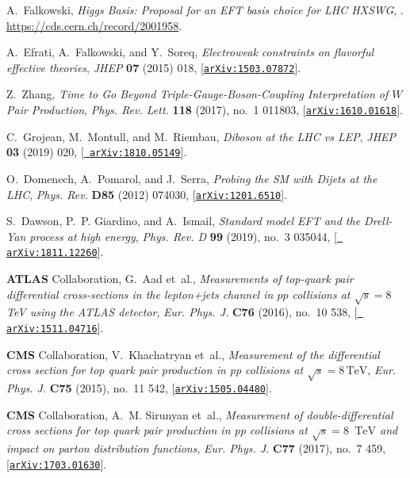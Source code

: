 \documentclass[11pt,a4paper]{article}
\numberwithin{equation}{section}
\numberwithin{figure}{section}
\numberwithin{table}{section}
\begin{document}
\begin{thebibliography}{100}
A.~Falkowski, {\it {Higgs Basis: Proposal for an EFT basis choice for LHC
  HXSWG}}, . \url{https://cds.cern.ch/record/2001958}.

A.~Efrati, A.~Falkowski, and Y.~Soreq, {\it {Electroweak constraints on
  flavorful effective theories}},  {\em JHEP} {\bf 07} (2015) 018,
  [\href{http://arxiv.org/abs/1503.07872}{{\tt arXiv:1503.07872}}].

Z.~Zhang, {\it {Time to Go Beyond Triple-Gauge-Boson-Coupling Interpretation of
  $W$ Pair Production}},  {\em Phys. Rev. Lett.} {\bf 118} (2017), no.~1
  011803, [\href{http://arxiv.org/abs/1610.01618}{{\tt arXiv:1610.01618}}].

C.~Grojean, M.~Montull, and M.~Riembau, {\it {Diboson at the LHC vs LEP}},
  {\em JHEP} {\bf 03} (2019) 020, [\href{http://arxiv.org/abs/1810.05149}{{\tt
  arXiv:1810.05149}}].

O.~Domenech, A.~Pomarol, and J.~Serra, {\it {Probing the SM with Dijets at the
  LHC}},  {\em Phys. Rev.} {\bf D85} (2012) 074030,
  [\href{http://arxiv.org/abs/1201.6510}{{\tt arXiv:1201.6510}}].

S.~Dawson, P.~P. Giardino, and A.~Ismail, {\it {Standard model EFT and the
  Drell-Yan process at high energy}},  {\em Phys. Rev. D} {\bf 99} (2019),
  no.~3 035044, [\href{http://arxiv.org/abs/1811.12260}{{\tt
  arXiv:1811.12260}}].

{\bf ATLAS} Collaboration, G.~Aad et~al., {\it {Measurements of top-quark pair
  differential cross-sections in the lepton+jets channel in $pp$ collisions at
  $\sqrt{s}=8$ TeV using the ATLAS detector}},  {\em Eur. Phys. J.} {\bf C76}
  (2016), no.~10 538, [\href{http://arxiv.org/abs/1511.04716}{{\tt
  arXiv:1511.04716}}].

{\bf CMS} Collaboration, V.~Khachatryan et~al., {\it {Measurement of the
  differential cross section for top quark pair production in pp collisions at
  $\sqrt{s} = 8\,\text {TeV} $}},  {\em Eur. Phys. J.} {\bf C75} (2015), no.~11
  542, [\href{http://arxiv.org/abs/1505.04480}{{\tt arXiv:1505.04480}}].

{\bf CMS} Collaboration, A.~M. Sirunyan et~al., {\it {Measurement of
  double-differential cross sections for top quark pair production in pp
  collisions at $\sqrt{s} = 8$ $\,\text {TeV}$ and impact on parton
  distribution functions}},  {\em Eur. Phys. J.} {\bf C77} (2017), no.~7 459,
  [\href{http://arxiv.org/abs/1703.01630}{{\tt arXiv:1703.01630}}].


\end{thebibliography}
\end{document}
